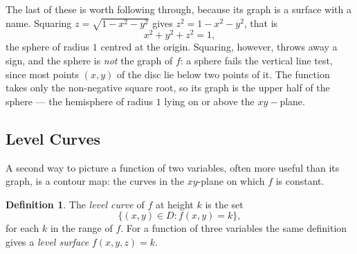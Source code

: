 \documentclass[11pt,a4paper]{article}
\theoremstyle{definition}
\newtheorem{defn}[thm]{Definition}
\begin{document}
The last of these is worth following through, because its graph is a surface
with a name. Squaring $z = \sqrt{1 - x^2 - y^2}$ gives $z^2 = 1 - x^2 - y^2$,
that is
\[x^2 + y^2 + z^2 = 1,\]
the sphere of radius $1$ centred at the origin. Squaring, however, throws away a
sign, and the sphere is \emph{not} the graph of $f$: a sphere fails the vertical
line test, since most points $(x,y)$ of the disc lie below two points of it. The
function takes only the non-negative square root, so its graph is the upper half
of the sphere --- the hemisphere of radius $1$ lying on or above the
$xy-$plane.



\begin{figure}[H]
\centering
{}
\end{figure}

{\color[wave]{485}\subsection{Level Curves}}

A second way to picture a function of two variables, often more useful than its
graph, is a contour map: the curves in the $xy$-plane on which $f$ is constant.

\begin{defn}
\label{defn:level}
The \emph{level curve} of $f$ at height $k$ is the set
\[\{(x,y)\in D : f(x,y) = k\},\]
for each $k$ in the range of $f$. For a function of three variables the same
definition gives a \emph{level surface} $f(x,y,z) = k$.
\end{defn}
\end{document}
